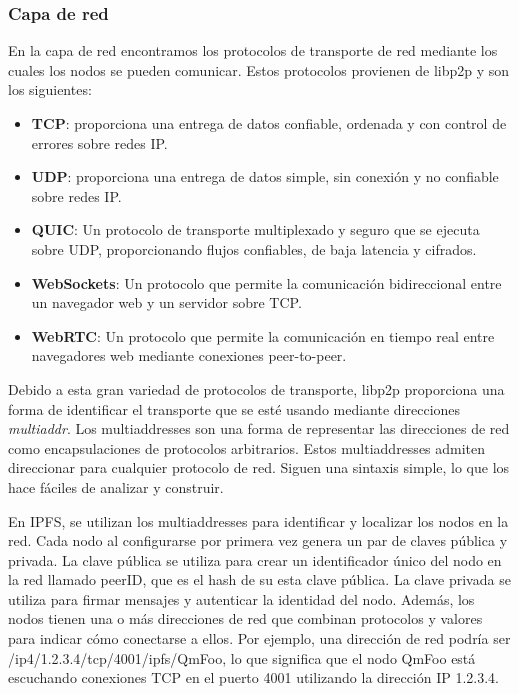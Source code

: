 \subsubsection{Capa de red}
En la capa de red encontramos los protocolos de transporte de red mediante los cuales los nodos se pueden comunicar. Estos protocolos provienen de libp2p\cite{labsLibp2pConnectivity} y son los siguientes:
\begin{itemize}[itemsep=1pt,nolistsep]
      \item \textbf{TCP}: proporciona una entrega de datos confiable, ordenada y con control de errores sobre redes IP.
      \item \textbf{UDP}: proporciona una entrega de datos simple, sin conexión y no confiable sobre redes IP.
      \item \textbf{QUIC}: Un protocolo de transporte multiplexado y seguro que se ejecuta sobre UDP, proporcionando flujos confiables, de baja latencia y cifrados.
      \item \textbf{WebSockets}: Un protocolo que permite la comunicación bidireccional entre un navegador web y un servidor sobre TCP.
      \item \textbf{WebRTC}: Un protocolo que permite la comunicación en tiempo real entre navegadores web mediante conexiones peer-to-peer.
\end{itemize}

Debido a esta gran variedad de protocolos de transporte, libp2p proporciona una forma de identificar el transporte que se esté usando mediante
direcciones \textit{multiaddr}.
Los multiaddresses son una forma de representar las direcciones de red como encapsulaciones de protocolos arbitrarios. Estos multiaddresses admiten direccionar
para cualquier protocolo de red. Siguen una sintaxis simple, lo que los hace fáciles de analizar y construir.

En IPFS, se utilizan los multiaddresses para identificar y localizar los nodos en la red. Cada nodo al configurarse por primera vez
genera un par de claves pública y privada. La clave pública se utiliza para crear un identificador único del nodo en la red llamado peerID, que es el hash de su esta clave pública. La clave privada se utiliza para firmar mensajes y autenticar la identidad del nodo. Además, los nodos tienen una o más direcciones de red que combinan protocolos y valores para indicar cómo conectarse a ellos. Por ejemplo, una dirección de red podría ser /ip4/1.2.3.4/tcp/4001/ipfs/QmFoo, lo que significa que el nodo QmFoo está escuchando conexiones TCP en el puerto 4001 utilizando la dirección IP 1.2.3.4.

